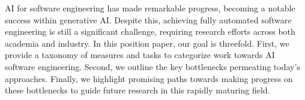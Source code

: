 AI for software engineering has made remarkable progress, becoming a notable success within generative AI. Despite this, achieving fully automated software engineering is still a significant challenge, requiring research efforts across both academia and industry. In this position paper, our goal is threefold. First, we provide a taxonomy of measures and tasks to categorize work towards AI software engineering. Second, we outline the key bottlenecks permeating today's approaches. Finally, we highlight promising paths towards making progress on these bottlenecks to guide future research in this rapidly maturing field.